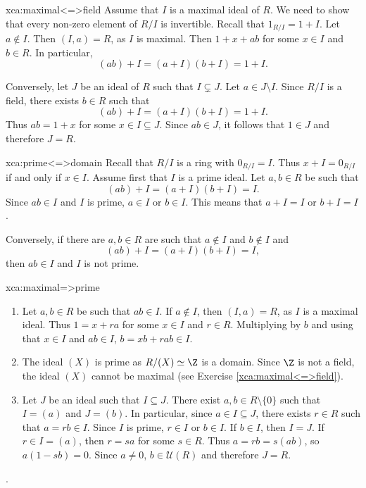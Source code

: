 
\begin{sol}{xca:maximal<=>field}
    Assume that $I$ is a maximal ideal of $R$. 
    We need to show that every non-zero element of $R/I$ 
    is invertible. Recall 
    that $1_{R/I}=1+I$. 
    Let $a\not\in I$. Then $(I,a)=R$, as
    $I$ is maximal. Then $1+x+ab$ for some $x\in I$ and $b\in R$.
    In particular, 
    \[
    (ab)+I=(a+I)(b+I)=1+I.
    \]
    
    Conversely, let $J$ be an ideal of $R$ 
    such that $I\subsetneq J$. Let $a\in J\setminus I$. 
    Since $R/I$ is a field, there exists $b\in R$ such that
    \[
    (ab)+I=(a+I)(b+I)=1+I.
    \]
    Thus $ab=1+x$ for some $x\in I\subseteq J$. Since $ab\in J$, 
    it follows that $1\in J$ and therefore $J=R$. 
\end{sol}

\begin{sol}{xca:prime<=>domain}
    Recall that $R/I$ is a ring with 
    $0_{R/I}=I$. Thus $x+I=0_{R/I}$ if and only if $x\in I$. 
    Assume first that $I$ is a prime ideal. 
    Let $a,b\in R$ be such that 
    \[
    (ab)+I=(a+I)(b+I)=I.
    \]
    Since
    $ab\in I$ and $I$ is prime, $a\in I$ or $b\in I$. This means
    that $a+I=I$ or $b+I=I$. 
    
    Conversely, if there are $a,b\in R$ 
    are such that $a\not\in I$ and $b\not\in I$ and 
    \[
    (ab)+I=(a+I)(b+I)=I,
    \]
    then $ab\in I$ and $I$ is not prime. 
\end{sol}

\begin{sol}{xca:maximal=>prime}\
\begin{enumerate}
    \item Let $a,b\in R$ be such that $ab\in I$. If $a\not\in I$, 
    then $(I,a)=R$, as $I$ is a maximal ideal. Thus $1=x+ra$ for
    some $x\in I$ and $r\in R$. Multiplying by $b$ and using
    that $x\in I$ and $ab\in I$,  
    $b=xb+rab\in I$. 
    \item The ideal $(X)$ is prime as $R/(X)\simeq\Z$ is a domain. Since     $\Z$ is not a field, the ideal $(X)$ cannot be maximal (see
        Exercise \ref{xca:maximal<=>field}). 
    \item Let $J$ be an ideal such that $I\subseteq J$. There 
        exist $a,b\in R\setminus\{0\}$
        such that $I=(a)$ and $J=(b)$. In particular, 
        since $a\in I\subseteq J$, there exists $r\in R$ such that
        $a=rb\in I$. Since $I$ is prime, $r\in I$ or $b\in I$. 
        If $b\in I$, then $I=J$. If $r\in I=(a)$, then 
        $r=sa$ for some $s\in R$. Thus  
        $a=rb=s(ab)$, so $a(1-sb)=0$. Since $a\ne 0$, 
        $b\in\mathcal{U}(R)$ and therefore $J=R$. 
\end{enumerate}
. 
\end{sol}

